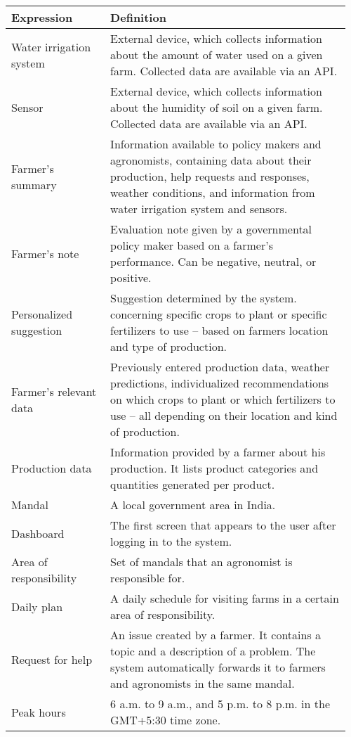 \begin{center}
	\begin{tabular}{@{}p{0.28\linewidth} p{0.68\linewidth}@{}}
		\toprule
		\textbf{Expression}     & \textbf{Definition}\\
		\midrule
		Water irrigation system & External device, which collects information about the amount of water used on a given farm. Collected data are available via an API. \\
        Sensor                  & External device, which collects information about the humidity of soil on a given farm. Collected data are available via an API.\\
        Farmer's summary        & Information available to policy makers and agronomists, containing data about their production, help requests and responses, weather conditions, and information from water irrigation system and sensors.\\
        Farmer's note           & Evaluation note given by a governmental policy maker based on a farmer's performance. Can be negative, neutral, or positive.\\
        Personalized suggestion & Suggestion determined by the system. concerning specific crops to plant or specific fertilizers to use – based on farmers location and type of production.\\
        Farmer's relevant data  & Previously entered production data, weather predictions, individualized recommendations on which crops to plant or which fertilizers to use – all depending on their location and kind of production.\\
        Production data         & Information provided by a farmer about his production. It lists product categories and quantities generated per product.\\
        Mandal                  & A local government area in India.\\
        Dashboard               & The first screen that appears to the user after logging in to the system.\\
        Area of responsibility  & Set of mandals that an agronomist is responsible for.\\
        Daily plan & A daily schedule for visiting farms in a certain area of responsibility.\\
        Request for help        & An issue created by a farmer. It contains a topic and a description of a problem. The system automatically forwards it to farmers and agronomists in the same mandal.\\
        Peak hours              & 6 a.m. to 9 a.m., and 5 p.m. to 8 p.m. in the GMT+5:30 time zone.\\
	\end{tabular}
\end{center}

